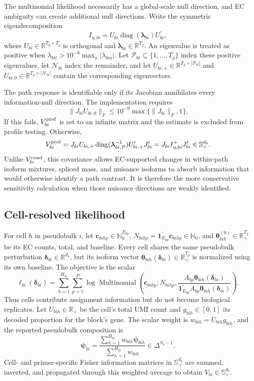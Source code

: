 \documentclass[11pt]{article}
\begin{document}
The multinomial likelihood necessarily has a global-scale null direction, and EC ambiguity can create additional null directions. Write the symmetric eigendecomposition \[
 I_{\eta,bi}=U_{bi}\operatorname{diag}(\bm\lambda_{bi})U_{bi}^\prime,
\]
where \(U_{bi}\in\mathbb R^{T_g\times T_g}\) is orthogonal and \(\bm\lambda_{bi}\in\mathbb R^{T_g}\). An eigenvalue is treated as positive when \(\lambda_{bit}>10^{-8}\max_u|\lambda_{biu}|\). Let \(\mathcal P_{bi}\subseteq\{1,\ldots,T_g\}\) index these positive eigenvalues, let \(\mathcal N_{bi}\) index the remainder, and let \(U_{bi,+}\in\mathbb R^{T_g\times|\mathcal P_{bi}|}\) and \(U_{bi,0}\in\mathbb R^{T_g\times|\mathcal N_{bi}|}\) contain the corresponding eigenvectors.

The path response is identifiable only if its Jacobian annihilates every information-null direction. The implementation requires \[
 \|J_{bi}U_{bi,0}\|_F
 \leq 10^{-9}\max\{\|J_{bi}\|_F,1\}.
\]
If this fails, \(V_{bi}^{\rm prof}\) is set to an infinite matrix and the estimate is excluded from profile testing. Otherwise, \[
 V_{bi}^{\rm prof}
 =J_{bi}U_{bi,+}
 \operatorname{diag}(\bm\lambda_{bi,\mathcal P}^{-1})
 U_{bi,+}^\prime J_{bi}^\prime
 =J_{bi}I_{\eta,bi}^{+}J_{bi}^\prime
 \in\mathbb S_+^{d_b}.
\]
Unlike \(V_{bi}^{\rm cond}\), this covariance allows EC-supported changes in within-path isoform mixtures, spliced mass, and nuisance isoforms to absorb information that would otherwise identify a path contrast. It is therefore the more conservative sensitivity calculation when those nuisance directions are weakly identified.

\subsection*{Cell-resolved likelihood}

For cell \(h\) in pseudobulk \(i\), let \(\bm c_{bihp}\in\mathbb N_0^{E_{bp}}\), \(N_{bihp}=\bm1_{E_{bp}}^\prime\bm c_{bihp}\in\mathbb N_0\), and \(\bm\theta_{bih}^{(0)}\in\mathbb R_+^{T_g}\) be its EC counts, total, and baseline. Every cell shares the same pseudobulk perturbation \(\bm\delta_{bi}\in\mathbb R^{d_b}\), but its isoform vector \(\bm\theta_{bih}(\bm\delta_{bi})\in\mathbb R_+^{T_g}\) is normalized using its own baseline. The objective is the scalar \[
 \ell_{bi}(\bm\delta_{bi})=
 \sum_{h=1}^{H_{bi}}\sum_{p=1}^P
 \log\operatorname{Multinomial}\left(
 \bm c_{bihp};N_{bihp},
 \frac{A_{bp}\bm\theta_{bih}(\bm\delta_{bi})}
 {\bm1_{E_{bp}}^\prime A_{bp}\bm\theta_{bih}(\bm\delta_{bi})}
 \right).
\]
Thus cells contribute assignment information but do not become biological replicates. Let \(U_{bih}\in\mathbb R_+\) be the cell's total UMI count and \(g_{bih}\in[0,1]\) its decoded proportion for the block's gene. The scalar weight is \(w_{bih}=U_{bih}g_{bih}\), and the reported pseudobulk composition is \[
 \bm\psi_{bi}=
 \frac{\sum_{h=1}^{H_{bi}}w_{bih}\bm\psi_{bih}}
 {\sum_{h=1}^{H_{bi}}w_{bih}}\in\Delta^{S_b-1}.
\]
Cell- and primer-specific Fisher information matrices in \(\mathbb S_+^{d_b}\) are summed, inverted, and propagated through this weighted average to obtain \(V_{bi}\in\mathbb S_+^{d_b}\).
\end{document}
